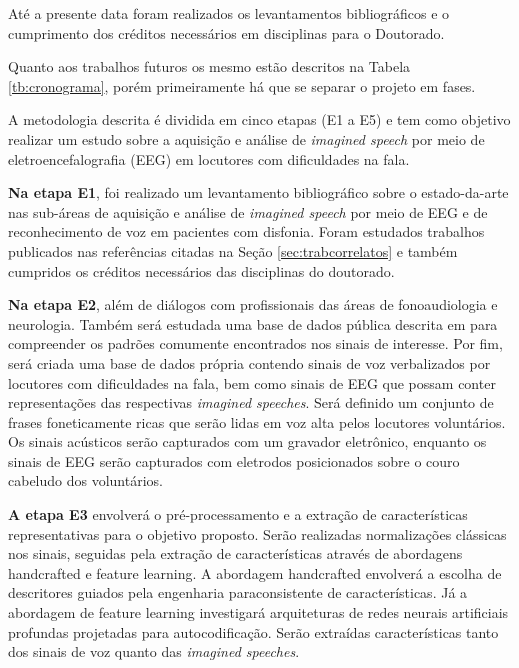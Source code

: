 \documentclass[a4paper,12pt,openright,oneside]{book}
\newenvironment{myenv}[1]
  {\begin{spacing}{#1}}
  {\end{spacing}}
\begin{document}
		\begin{myenv}{1.5}
			\par Até a presente data foram realizados os levantamentos bibliográficos e o cumprimento dos créditos necessários em disciplinas para o Doutorado.
			\par Quanto aos trabalhos futuros os mesmo estão descritos na Tabela \ref{tb:cronograma}, porém primeiramente há que se separar o projeto em fases.
			
			\par A metodologia descrita é dividida em cinco etapas (E1 a E5) e tem como objetivo realizar um estudo sobre a aquisição e análise de \textit{imagined speech} por meio de eletroencefalografia (EEG) em locutores com dificuldades na fala.\newline
			
			\par \textbf{Na etapa E1}, foi realizado um levantamento bibliográfico sobre o estado-da-arte nas sub-áreas de aquisição e análise de \textit{imagined speech} por meio de EEG e de reconhecimento de voz em pacientes com disfonia. Foram estudados trabalhos publicados nas referências citadas na Seção \ref{sec:trabcorrelatos} e também cumpridos os créditos necessários das disciplinas do doutorado.\newline
			
			\par \textbf{Na etapa E2}, além de diálogos com profissionais das áreas de fonoaudiologia e neurologia. Também será estudada uma base de dados pública descrita em \cite{10.1117/12.2255697} para compreender os padrões comumente encontrados nos sinais de interesse. Por fim, será criada uma base de dados própria contendo sinais de voz verbalizados por locutores com dificuldades na fala, bem como sinais de EEG que possam conter representações das respectivas \textit{imagined speeches}. Será definido um conjunto de frases foneticamente ricas que serão lidas em voz alta pelos locutores voluntários. Os sinais acústicos serão capturados com um gravador eletrônico, enquanto os sinais de EEG serão capturados com eletrodos posicionados sobre o couro cabeludo dos voluntários.\newline
			
			\par \textbf{A etapa E3} envolverá o pré-processamento e a extração de características representativas para o objetivo proposto. Serão realizadas normalizações clássicas nos sinais, seguidas pela extração de características através de abordagens handcrafted e feature learning. A abordagem handcrafted envolverá a escolha de descritores guiados pela engenharia paraconsistente de características. Já a abordagem de feature learning investigará arquiteturas de redes neurais artificiais profundas projetadas para autocodificação. Serão extraídas características tanto dos sinais de voz quanto das \textit{imagined speeches}.\newline
			

\end{myenv}
\end{document}
